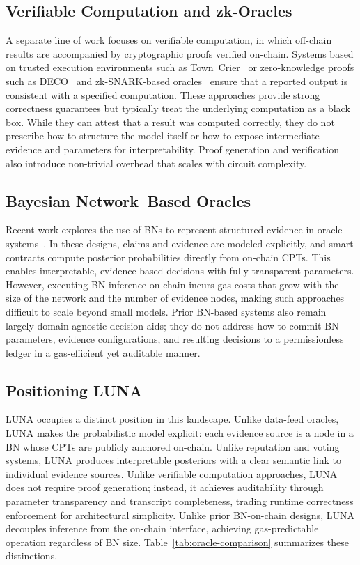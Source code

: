 \documentclass[journal]{IEEEtran}
\begin{document}
\subsection{Verifiable Computation and zk-Oracles}

A separate line of work focuses on verifiable
computation, in which off-chain results are accompanied
by cryptographic proofs verified on-chain.
Systems based on trusted execution environments such as
Town~Crier~\cite{zhang2016town} or zero-knowledge
proofs such as DECO~\cite{zhang2020deco} and
zk-SNARK-based oracles~\cite{garg2022succinct} ensure
that a reported output is consistent with a specified
computation.
These approaches provide strong correctness guarantees
but typically treat the underlying computation as a
black box.
While they can attest that a result was computed
correctly, they do not prescribe how to structure the
model itself or how to expose intermediate evidence and
parameters for interpretability.
Proof generation and verification also introduce
non-trivial overhead that scales with circuit complexity.

\subsection{Bayesian Network--Based Oracles}

Recent work explores the use of BNs to represent
structured evidence in oracle systems~\cite{bn-oracle}.
In these designs, claims and evidence are modeled
explicitly, and smart contracts compute posterior
probabilities directly from on-chain CPTs.
This enables interpretable, evidence-based decisions
with fully transparent parameters.
However, executing BN inference on-chain incurs gas
costs that grow with the size of the network and the
number of evidence nodes, making such approaches
difficult to scale beyond small models.
Prior BN-based systems also remain largely
domain-agnostic decision aids; they do not address how
to commit BN parameters, evidence configurations, and
resulting decisions to a permissionless ledger in a
gas-efficient yet auditable manner.

\subsection{Positioning LUNA}

LUNA occupies a distinct position in this landscape.
Unlike data-feed oracles, LUNA makes the probabilistic
model explicit: each evidence source is a node in a BN
whose CPTs are publicly anchored on-chain.
Unlike reputation and voting systems, LUNA produces
interpretable posteriors with a clear semantic link to
individual evidence sources.
Unlike verifiable computation approaches, LUNA does not
require proof generation; instead, it achieves
auditability through parameter transparency and
transcript completeness, trading runtime correctness
enforcement for architectural simplicity.
Unlike prior BN-on-chain designs, LUNA decouples
inference from the on-chain interface, achieving
gas-predictable operation regardless of BN size.
Table~\ref{tab:oracle-comparison} summarizes these
distinctions.
\end{document}
